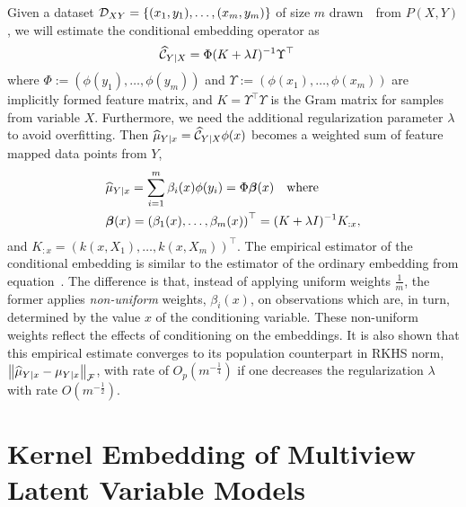 \documentclass[11pt]{article}
\newcommand{\hmu}{\widehat{\mu}}
\begin{document}
Given a dataset $\mathcal{D}_{XY}=\left\{(x_1,y_1),\ldots,(x_m,y_m)\right\}$ of size $m$ drawn~\iid~from $P(X,Y)$, we will estimate the conditional embedding operator as
\begin{align}
    & \widehat{\mathcal{C}}_{Y|X} = \Phi (K + \lambda I)^{-1} \Upsilon^\top  \label{eq:embeddingoperatorestimator}
\end{align}
where $\Phi:=(\phi(y_1),\ldots,\phi(y_m))$ and $\Upsilon:=(\phi(x_1),\ldots,\phi(x_m))$ are implicitly formed feature matrix, and $K=\Upsilon^\top \Upsilon$ is the Gram matrix for samples from variable $X$. Furthermore, we need the additional regularization parameter $\lambda$ to avoid overfitting. Then $\hmu_{Y|x}=\widehat{\Ccal}_{Y|X}\phi(x)$ becomes a weighted sum of feature mapped data points from $Y$,
\begin{align}
    & \hmu_{Y|x} = \sum_{i=1}^m \beta_i(x) \phi(y_i) = \Phi \boldsymbol{\beta}(x) \quad \text{where}~ \label{eq:conditionalembeddingestimator}\\
    & \boldsymbol{\beta}(x) = \rbr{\beta_1(x), \ldots, \beta_m(x)}^\top = (K + \lambda I)^{-1} K_{: x}, \nonumber
\end{align}
and $K_{: x}=(k(x,X_1),\ldots,k(x,X_m))^\top$.
The empirical estimator of the conditional embedding
is similar to the estimator of the ordinary embedding from
equation~. The difference
is that, instead of applying uniform weights $\frac{1}{m}$,
the former applies {\em non-uniform} weights, $\beta_i(x)$, on
observations which are, in turn, determined by the value $x$ of the conditioning
variable. These non-uniform weights reflect the effects of
conditioning on the embeddings. It is also shown that this empirical estimate converges to its population counterpart in RKHS norm, $\nbr{\hmu_{Y|x} - \mu_{Y|x}}_{\Fcal}$, with rate of $O_p(m^{-\frac{1}{4}})$ if one decreases the regularization $\lambda$ with rate $O(m^{-\frac{1}{2}})$.

\section{Kernel Embedding of Multiview Latent Variable Models}
\end{document}
